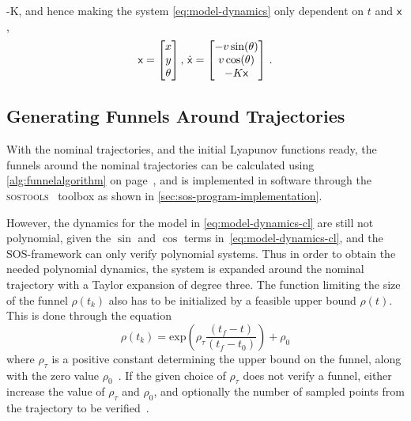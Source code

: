 -K\), and hence making the system \cref{eq:model-dynamics} only
dependent on \(t\) and \({\mathbf{\mathsf{x}}}\),
\begin{equation}
  \label{eq:model-dynamics-cl}
  {\mathbf{\mathsf{x}}} =
  \begin{bmatrix}
    x \\ y \\ \theta \\
  \end{bmatrix}, \, \dot{{\mathbf{\mathsf{x}}}} =
  \begin{bmatrix}
    -v \sin(\theta) \\
    v \cos(\theta) \\
    -K{\mathbf{\mathsf{x}}} \\
  \end{bmatrix} \, .
\end{equation}

\subsection{Generating Funnels Around Trajectories}
\label{subsec:generating-funnels}

With the nominal trajectories, and the initial Lyapunov functions ready, the
funnels around the nominal trajectories can be calculated using
\cref{alg:funnelalgorithm} on page~\pageref{alg:funnelalgorithm}, and is
implemented in software through the \textsc{sostools}~\cite{sostools} toolbox as
shown in \cref{sec:sos-program-implementation}.

However, the dynamics for the model in \cref{eq:model-dynamics-cl} are still not
polynomial, given the \(\sin\) and \(\cos\) terms
in~\eqref{eq:model-dynamics-cl}, and the \ac{SOS}-framework can only verify
polynomial systems. Thus in order to obtain the needed polynomial dynamics, the
system is expanded around the nominal trajectory with a Taylor expansion of
degree three. The function limiting the size of the funnel \(\rho(t_{k})\) also
has to be initialized by a feasible upper bound \(\rho(t)\). This is done
through the equation
\begin{equation}
  \rho(t_{k}) = \mathrm{exp}\left( \rho_{\tau}\frac{\left( t_{f} - t \right)}{\left( t_{f} - t_{0}  \right)}\right) + \rho_0
\end{equation}
where \(\rho_{\tau}\) is a positive constant determining the upper bound on the
funnel, along with the zero value \(\rho_0\)~\cite{Tobenkin_2011}. If the given
choice of \(\rho_{\tau}\) does not verify a funnel, either increase the value of
\(\rho_{\tau}\) and \(\rho_0\), and optionally the number of sampled points from
the trajectory to be verified~\cite{Tobenkin_2011}.


